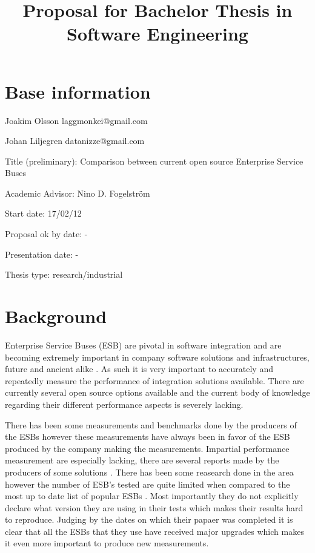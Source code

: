 \documentclass[10pt,a4paper]{proposal}
\title{Proposal for Bachelor Thesis in Software Engineering}
\begin{document}
\maketitle
\thispagestyle{fancy}


\section*{Base information}

Joakim Olsson laggmonkei@gmail.com

Johan Liljegren datanizze@gmail.com

Title (preliminary): Comparison between current open source Enterprise Service Buses

Academic Advisor:  Nino D. Fogelström

Start date: 17/02/12

Proposal ok by date: -

Presentation date: -


Thesis type: research\slash industrial


\section*{Background}


Enterprise Service Buses (ESB) \cite{falko07} are pivotal in software integration and are becoming extremely important in company software solutions and infrastructures, future and ancient alike \cite{fenner03}.
As such it is very important to accurately and repeatedly measure the performance of integration solutions available. 
There are currently several open source options available \cite{mehta11} and the current body of knowledge regarding their different performance aspects is severely lacking. 


There has been some measurements and benchmarks done by the producers of the ESBs however these measurements have always been in favor of the ESB produced by the company making the measurements. 
Impartial performance measurement are especially lacking, there are several reports made by the producers of some solutions \cite{Perera07,mulevsjboss,mulevsglassfish,mulevsservicemix,mulesoft08}.
There has been some reasearch done in the area \cite{ESBthesis} however the number of ESB's tested are quite limited when compared to the most up to date list of popular ESBs \cite{mehta11}.
Most importantly they do not explicitly declare what version they are using in their tests which makes their results hard to reproduce. 
Judging by the dates on which their papaer was completed it is clear that all the ESBs that they use have received major upgrades which makes it even more important to produce new measurements.
\end{document}
